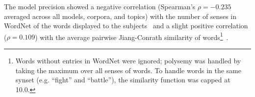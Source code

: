 The model precision showed a negative correlation (Spearman's $\rho =
-0.235$ averaged across all models, corpora, and topics) with the
number of senses in WordNet of the words displayed to the
subjects~\cite{Miller90} and a slight positive correlation ($\rho =
0.109$) with the average pairwise Jiang-Conrath similarity of
words\footnote{Words without entries in WordNet were ignored; polysemy
  was handled by taking the maximum over all senses of words.  To
  handle words in the same synset (e.g. ``fight'' and ``battle''), the
  similarity function was capped at 10.0.}~\cite{jiang-97}.  

